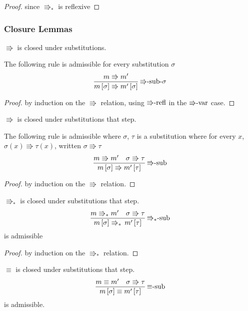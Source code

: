 \begin{proof}
since $\Rrightarrow_{\ast}$ is reflexive
\end{proof}

\subsubsection{Closure Lemmas}
\begin{lem}
$\Rrightarrow$ is closed under substitutions.

The following rule is admissible for every substitution $\sigma$
\[
\frac{m\Rrightarrow m'}{m\left[\sigma\right]\Rrightarrow m'\left[\sigma\right]}\,\textrm{\ensuremath{\Rrightarrow}-sub-\ensuremath{\sigma}}
\]
\end{lem}


\begin{proof}
by induction on the $\Rrightarrow$ relation, using $\textrm{\ensuremath{\Rrightarrow}-refl}$
in the $\textrm{\ensuremath{\Rrightarrow}-var}$ case.
\end{proof}
\begin{lem}
$\Rrightarrow$ is closed under substitutions that step.

The following rule is admissible where $\sigma$, $\tau$ is a substitution
where for every $x$, $\sigma\left(x\right)\Rrightarrow\tau\left(x\right)$,
written $\sigma\Rrightarrow\tau$
\[
\frac{m\Rrightarrow m'\quad\sigma\Rrightarrow\tau}{m\left[\sigma\right]\Rrightarrow m'\left[\tau\right]}\,\textrm{\ensuremath{\Rrightarrow}-sub}
\]
\end{lem}

\begin{proof}
by induction on the $\Rrightarrow$ relation.
\end{proof}
\begin{lem}
$\Rrightarrow_{\ast}$ is closed under substitutions that step.
\[
\frac{m\Rrightarrow_{\ast}m'\quad\sigma\Rrightarrow\tau}{m\left[\sigma\right]\Rrightarrow_{\ast}\,m'\left[\tau\right]}\,\textrm{\ensuremath{\Rrightarrow_{\ast}}-sub}
\]
is admissible 
\end{lem}

\begin{proof}
by induction on the $\Rrightarrow_{\ast}$ relation. 
\end{proof}
\begin{lem}
$\equiv$ is closed under substitutions that step.
\[
\frac{m\equiv m'\quad\sigma\Rrightarrow\tau}{m\left[\sigma\right]\equiv m'\left[\tau\right]}\,\textrm{\ensuremath{\equiv}-sub}
\]
is admissible.
\end{lem}

